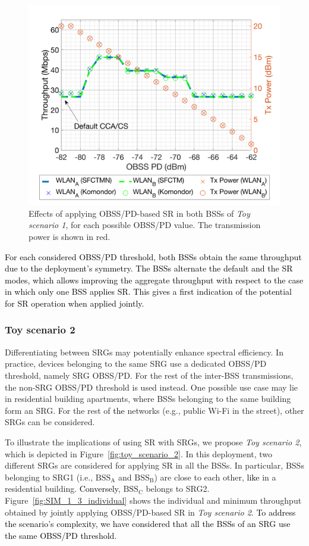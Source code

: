 \documentclass[preprint,12pt]{elsarticle}
\theoremstyle{plain}
\begin{document}
\begin{figure}[ht!]
	\centering
	\includegraphics[width=.5\columnwidth]{SIM_1_1b}
	\caption{Effects of applying OBSS/PD-based SR in both BSSs of \emph{Toy scenario 1}, for each possible OBSS/PD value. The transmission power is shown in red.}		
	\label{fig:toy_scenario_1c_results}
\end{figure}

\textcolor{black}{For each considered OBSS/PD threshold, both BSSs obtain the same throughput due to the deployment's symmetry. The BSSs alternate the default and the SR modes, which allows improving the aggregate throughput with respect to the case in which only one BSS applies SR. This gives a first indication of the potential for SR operation when applied jointly.}

\subsubsection{Toy scenario 2}
\label{section:advanced_interactions}
Differentiating between SRGs may potentially enhance spectral efficiency. In practice, devices belonging to the same SRG use a dedicated OBSS/PD threshold, namely SRG OBSS/PD. For the rest of the inter-BSS transmissions, the non-SRG OBSS/PD threshold is used instead. One possible use case may lie in residential building apartments, where BSSs belonging to the same building form an SRG. For the rest of \textcolor{black}{the} networks (e.g., public Wi-Fi in the street), other SRGs can be considered. 

To illustrate the implications of using SR with SRGs, we propose \emph{Toy scenario 2}, which is depicted in Figure~\ref{fig:toy_scenario_2}. In this deployment, two different SRGs are considered for applying SR in all the BSSs. In particular, BSSs belonging to SRG1 (i.e., $\text{BSS}_\text{A}$ and $\text{BSS}_\text{B}$) are close to each other, \textcolor{black}{like} in a residential building. \textcolor{black}{Conversely}, $\text{BSS}_\text{C}$ belongs to SRG2. Figure~\ref{fig:SIM_1_3_individual} shows the individual and minimum throughput obtained by jointly applying OBSS/PD-based SR in \emph{Toy scenario 2}. \textcolor{black}{To address the scenario's complexity, we have considered that all the BSSs of an SRG use the same OBSS/PD threshold.}
\end{document}
